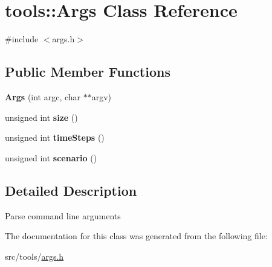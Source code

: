 \hypertarget{classtools_1_1Args}{\section{tools\-:\-:Args Class Reference}
\label{classtools_1_1Args}
}


{\ttfamily \#include $<$args.\-h$>$}

\subsection*{Public Member Functions}
\begin{DoxyCompactItemize}
\item 
\hypertarget{classtools_1_1Args_ae76fc7da42f02c3803c704945e09889a}{{\bfseries Args} (int argc, char $\ast$$\ast$argv)}\label{classtools_1_1Args_ae76fc7da42f02c3803c704945e09889a}

\item 
\hypertarget{classtools_1_1Args_a797dee3c2572f4970633923efe02a952}{unsigned int {\bfseries size} ()}\label{classtools_1_1Args_a797dee3c2572f4970633923efe02a952}

\item 
\hypertarget{classtools_1_1Args_a80525b2b8c459ed083973934092078b2}{unsigned int {\bfseries time\-Steps} ()}\label{classtools_1_1Args_a80525b2b8c459ed083973934092078b2}

\item 
\hypertarget{classtools_1_1Args_a5dd04ac82f2ae47652e30ed0ff9b942c}{unsigned int {\bfseries scenario} ()}\label{classtools_1_1Args_a5dd04ac82f2ae47652e30ed0ff9b942c}

\end{DoxyCompactItemize}


\subsection{Detailed Description}
Parse command line arguments 

The documentation for this class was generated from the following file\-:\begin{DoxyCompactItemize}
\item 
src/tools/\hyperlink{args_8h}{args.\-h}\end{DoxyCompactItemize}
